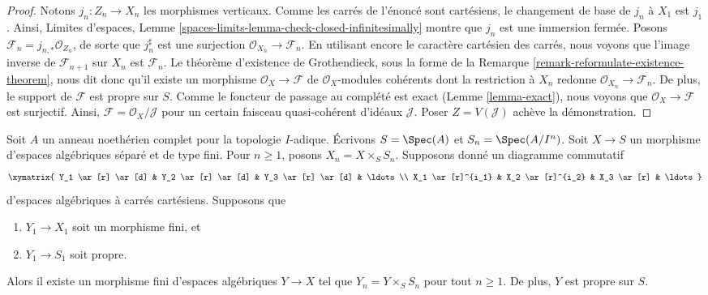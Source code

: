 \begin{proof}
Notons $j_n : Z_n \to X_n$ les morphismes verticaux.
Comme les carrés de l'énoncé sont cartésiens,
le changement de base de $j_n$ à $X_1$ est $j_1$.
Ainsi, Limites d'espaces, Lemme
\ref{spaces-limits-lemma-check-closed-infinitesimally}
montre que $j_n$ est une immersion fermée.
Posons $\mathcal{F}_n = j_{n, *}\mathcal{O}_{Z_n}$, de sorte que
$j_n^\sharp$ est une surjection $\mathcal{O}_{X_n} \to \mathcal{F}_n$.
En utilisant encore le caractère cartésien des carrés, nous voyons que
l'image inverse de $\mathcal{F}_{n + 1}$ sur $X_n$ est $\mathcal{F}_n$.
Le théorème d'existence de Grothendieck, sous la forme de la
Remarque \ref{remark-reformulate-existence-theorem},
nous dit donc qu'il existe un morphisme
$\mathcal{O}_X \to \mathcal{F}$
de $\mathcal{O}_X$-modules cohérents dont la restriction à
$X_n$ redonne $\mathcal{O}_{X_n} \to \mathcal{F}_n$.
De plus, le support de $\mathcal{F}$ est propre sur $S$.
Comme le foncteur de passage au complété est exact (Lemme \ref{lemma-exact}),
nous voyons que $\mathcal{O}_X \to \mathcal{F}$
est surjectif. Ainsi, $\mathcal{F} = \mathcal{O}_X/\mathcal{J}$
pour un certain faisceau quasi-cohérent d'idéaux $\mathcal{J}$.
Poser $Z = V(\mathcal{J})$ achève la démonstration.
\end{proof}

\begin{lemma}
\label{lemma-algebraize-formal-algebraic-space-finite-over-proper}
Soit $A$ un anneau noethérien complet pour la topologie $I$-adique.
Écrivons $S = \Spec(A)$ et $S_n = \Spec(A/I^n)$.
Soit $X \to S$ un morphisme d'espaces algébriques séparé
et de type fini.
Pour $n \geq 1$, posons $X_n = X \times_S S_n$.
Supposons donné un diagramme commutatif
$$
\xymatrix{
Y_1 \ar[r] \ar[d] & Y_2 \ar[r] \ar[d] & Y_3 \ar[r] \ar[d] & \ldots \\
X_1 \ar[r]^{i_1} & X_2 \ar[r]^{i_2} & X_3 \ar[r] & \ldots
}
$$
d'espaces algébriques à carrés cartésiens. Supposons que
\begin{enumerate}
\item $Y_1 \to X_1$ soit un morphisme fini, et
\item $Y_1 \to S_1$ soit propre.
\end{enumerate}
Alors il existe un morphisme fini d'espaces algébriques $Y \to X$ tel que
$Y_n = Y \times_S S_n$ pour tout $n \geq 1$. De plus, $Y$ est propre sur $S$.
\end{lemma}

